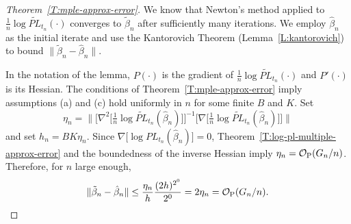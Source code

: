 \documentclass[final]{statsoc}
\newcommand{\qedhere}{}
\begin{document}
\begin{proof}[Theorem~\ref{T:mple-approx-error}]

We know that Newton's method applied to
$\tfrac{1}{n}\log \widetilde{\mathit{PL}}_{t_n}(\cdot)$ converges to
$\tilde \beta_n$ after sufficiently many iterations.  We employ $\hat \beta_n$ as the
initial iterate and use the Kantorovich Theorem (Lemma~\ref{L:kantorovich})
to bound $\|\tilde \beta_n - \hat \beta_n\|$.

In the notation of the lemma, $P(\cdot)$ is the gradient of
$\tfrac{1}{n} \log \widetilde{\mathit{PL}}_{t_n}(\cdot)$ and
$P'(\cdot)$ is its Hessian.
The conditions of Theorem~\ref{T:mple-approx-error} imply assumptions
(a) and (c) hold uniformly in $n$ for some finite $B$ and $K$.
Set
\[
    \eta_n =
    \Big\|
        \Big[
            \nabla^2\big[
                \tfrac{1}{n}
                \log \widetilde{\mathit{PL}}_{t_n}(\hat \beta_{n})
            \big]
        \Big]^{-1}
        \Big[
            \nabla\big[
                \tfrac{1}{n}
                \log \widetilde{\mathit{PL}}_{t_n}(\hat \beta_{n})
            \big]
        \Big]
    \Big\|
\]
and set $h_n = B K \eta_n$.
Since $\nabla\big[\log {\mathit{PL}}_{t_n}(\hat \beta_{n})\big] = 0$,
Theorem~\ref{T:log-pl-multiple-approx-error} and the boundedness of the
inverse Hessian imply $\eta_n = \mathcal{O}_\text{P}(G_n/n)$.  Therefore, for $n$
large enough,
\[
    \| \tilde \beta_n - \hat \beta_n \|
        \leq \frac{\eta_n}{h}\frac{(2h)^{2^0}}{2^0}
        = 2 \eta_n
        = \OhP(G_n/n).
    \qedhere
\]
\end{proof}




\end{document}
